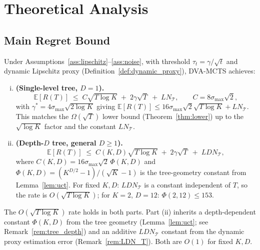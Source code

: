 \section{Theoretical Analysis}
\label{sec:theory}

\subsection{Main Regret Bound}

\begin{theorem}
\label{thm:main}
Under Assumptions~\ref{ass:lipschitz}--\ref{ass:noise}, with threshold
$\tau_t = \gamma / \sqrt{t}$ and dynamic Lipschitz proxy
(Definition~\ref{def:dynamic_proxy}), DVA-MCTS achieves:
\begin{enumerate}[(i)]
  \item \textbf{(Single-level tree, $D{=}1$).}
        \[
          \mathbb{E}[R(T)] \;\leq\; C\sqrt{T\log K} \;+\; 2\gamma\sqrt{T}
                                   \;+\; LN_{\mathcal{T}},
          \qquad C = 8\sigma_{\max}\sqrt{2},
        \]
        with $\gamma^* = 4\sigma_{\max}\sqrt{2\log K}$ giving
        $\mathbb{E}[R(T)] \leq 16\sigma_{\max}\sqrt{2}\sqrt{T\log K} + LN_{\mathcal{T}}$.
        This matches the $\Omega(\sqrt{T})$ lower bound (Theorem~\ref{thm:lower})
        up to the $\sqrt{\log K}$ factor and the constant $LN_{\mathcal{T}}$.
  \item \textbf{(Depth-$D$ tree, general $D \geq 1$).}
        \[
          \mathbb{E}[R(T)] \;\leq\; C(K,D)\sqrt{T\log K} \;+\; 2\gamma\sqrt{T}
                                   \;+\; LDN_{\mathcal{T}},
        \]
        where $C(K,D) = 16\sigma_{\max}\sqrt{2}\,\Phi(K,D)$ and
        $\Phi(K,D) = (K^{D/2}-1)/(\sqrt{K}-1)$ is the tree-geometry constant
        from Lemma~\ref{lem:uct}.  For fixed $K, D$: $LDN_{\mathcal{T}}$ is a constant
        independent of $T$, so the rate is $O(\sqrt{T\log K})$;
        for $K{=}2$, $D{=}12$: $\Phi(2,12) \leq 153$.
\end{enumerate}
The $O(\sqrt{T\log K})$ rate holds in both parts.
Part (ii) inherits a depth-dependent constant $\Phi(K,D)$ from the tree geometry
(Lemma~\ref{lem:uct}; see Remark~\ref{rem:tree_depth}) and an additive
$LDN_{\mathcal{T}}$ constant from the dynamic proxy estimation error
(Remark~\ref{rem:LDN_T}).  Both are $O(1)$ for fixed $K, D$.
\end{theorem}

